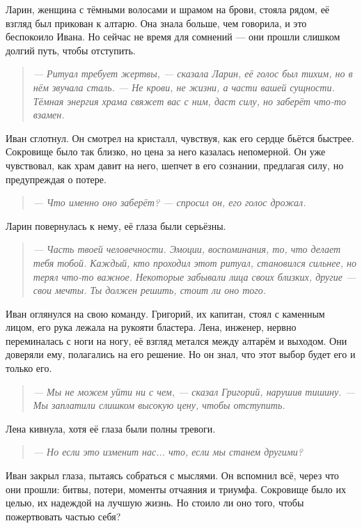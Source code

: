 \documentclass[12pt,a4paper]{book} %
\newenvironment{dialogue}{\begin{quote}\itshape}{\end{quote}}
\begin{document}
Ларин, женщина с тёмными волосами и шрамом на брови, стояла рядом, её взгляд был прикован к алтарю. Она знала больше, чем говорила, и это беспокоило Ивана. Но сейчас не время для сомнений --- они прошли слишком долгий путь, чтобы отступить.

\begin{dialogue}
--- Ритуал требует жертвы, --- сказала Ларин, её голос был тихим, но в нём звучала сталь. --- Не крови, не жизни, а части вашей сущности. Тёмная энергия храма свяжет вас с ним, даст силу, но заберёт что-то взамен.
\end{dialogue}

Иван сглотнул. Он смотрел на кристалл, чувствуя, как его сердце бьётся быстрее. Сокровище было так близко, но цена за него казалась непомерной. Он уже чувствовал, как храм давит на него, шепчет в его сознании, предлагая силу, но предупреждая о потере.

\begin{dialogue}
--- Что именно оно заберёт? --- спросил он, его голос дрожал.
\end{dialogue}

Ларин повернулась к нему, её глаза были серьёзны.

\begin{dialogue}
--- Часть твоей человечности. Эмоции, воспоминания, то, что делает тебя тобой. Каждый, кто проходил этот ритуал, становился сильнее, но терял что-то важное. Некоторые забывали лица своих близких, другие --- свои мечты. Ты должен решить, стоит ли оно того.
\end{dialogue}

Иван оглянулся на свою команду. Григорий, их капитан, стоял с каменным лицом, его рука лежала на рукояти бластера. Лена, инженер, нервно переминалась с ноги на ногу, её взгляд метался между алтарём и выходом. Они доверяли ему, полагались на его решение. Но он знал, что этот выбор будет его и только его.

\begin{dialogue}
--- Мы не можем уйти ни с чем, --- сказал Григорий, нарушив тишину. --- Мы заплатили слишком высокую цену, чтобы отступить.
\end{dialogue}

Лена кивнула, хотя её глаза были полны тревоги.

\begin{dialogue}
--- Но если это изменит нас... что, если мы станем другими?
\end{dialogue}

Иван закрыл глаза, пытаясь собраться с мыслями. Он вспомнил всё, через что они прошли: битвы, потери, моменты отчаяния и триумфа. Сокровище было их целью, их надеждой на лучшую жизнь. Но стоило ли оно того, чтобы пожертвовать частью себя?
\end{document}
